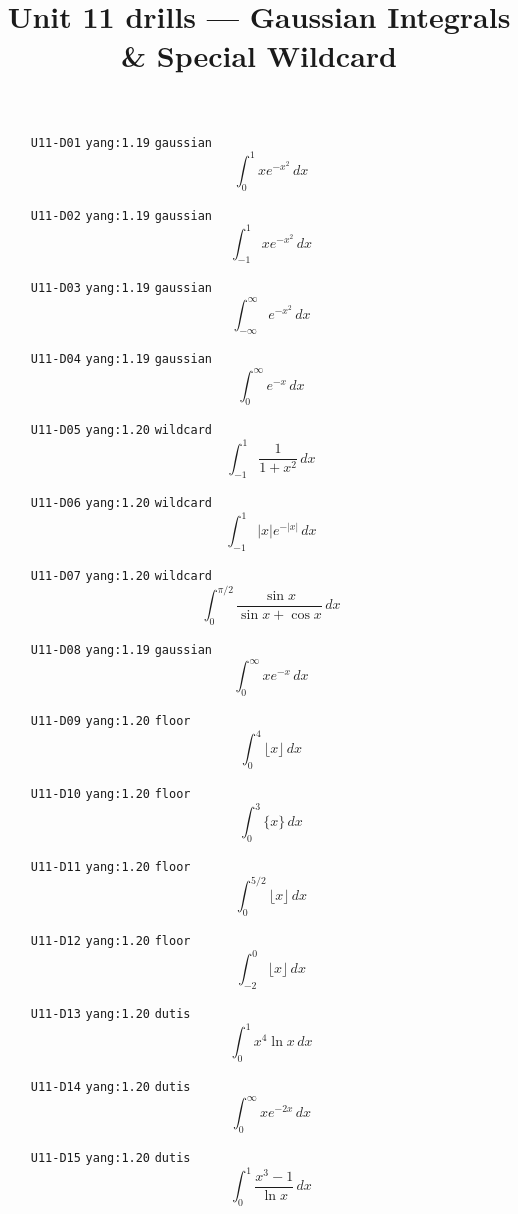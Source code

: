 
\title{Unit 11 drills --- Gaussian Integrals \& Special Wildcard}

\maketitle
\begin{enumerate}
\item[\texttt{U11-D01}] \texttt{yang:1.19} \texttt{gaussian}
\[ \int_0^1 x e^{-x^2}\,dx \]
\item[\texttt{U11-D02}] \texttt{yang:1.19} \texttt{gaussian}
\[ \int_{-1}^{1} x e^{-x^2}\,dx \]
\item[\texttt{U11-D03}] \texttt{yang:1.19} \texttt{gaussian}
\[ \int_{-\infty}^{\infty} e^{-x^2}\,dx \]
\item[\texttt{U11-D04}] \texttt{yang:1.19} \texttt{gaussian}
\[ \int_0^{\infty} e^{-x}\,dx \]
\item[\texttt{U11-D05}] \texttt{yang:1.20} \texttt{wildcard}
\[ \int_{-1}^{1}\frac{1}{1+x^2}\,dx \]
\item[\texttt{U11-D06}] \texttt{yang:1.20} \texttt{wildcard}
\[ \int_{-1}^{1}|x|e^{-|x|}\,dx \]
\item[\texttt{U11-D07}] \texttt{yang:1.20} \texttt{wildcard}
\[ \int_0^{\pi/2}\frac{\sin x}{\sin x+\cos x}\,dx \]
\item[\texttt{U11-D08}] \texttt{yang:1.19} \texttt{gaussian}
\[ \int_0^{\infty} x e^{-x}\,dx \]
\item[\texttt{U11-D09}] \texttt{yang:1.20} \texttt{floor}
\[ \int_0^{4}\lfloor x\rfloor\,dx \]
\item[\texttt{U11-D10}] \texttt{yang:1.20} \texttt{floor}
\[ \int_0^{3}\{x\}\,dx \]
\item[\texttt{U11-D11}] \texttt{yang:1.20} \texttt{floor}
\[ \int_0^{5/2}\lfloor x\rfloor\,dx \]
\item[\texttt{U11-D12}] \texttt{yang:1.20} \texttt{floor}
\[ \int_{-2}^{0}\lfloor x\rfloor\,dx \]
\item[\texttt{U11-D13}] \texttt{yang:1.20} \texttt{dutis}
\[ \int_0^{1} x^{4}\ln x\,dx \]
\item[\texttt{U11-D14}] \texttt{yang:1.20} \texttt{dutis}
\[ \int_0^{\infty} x e^{-2x}\,dx \]
\item[\texttt{U11-D15}] \texttt{yang:1.20} \texttt{dutis}
\[ \int_0^{1}\frac{x^{3}-1}{\ln x}\,dx \]
\end{enumerate}

